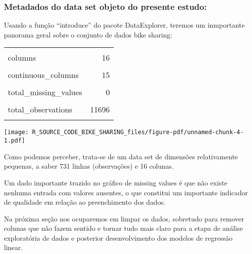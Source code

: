 \documentclass[
  letterpaper,
  DIV=11,
  numbers=noendperiod]{scrartcl}
\begin{document}
\subsubsection{Metadados do data set objeto do presente
estudo:}\label{metadados-do-data-set-objeto-do-presente-estudo}

Usando a função ``introduce'' do pacote DataExplorer, teremos um
inmportante panorama geral sobre o conjunto de dados bike sharing:

\begin{table}[!h]
\centering\begingroup\fontsize{8}{10}\selectfont

\begin{tabular}{lr}
\toprule
\cellcolor{gray!15}{rows} & \cellcolor{gray!15}{731}\\
columns & 16\\
\cellcolor{gray!15}{discrete\_columns} & \cellcolor{gray!15}{1}\\
continuous\_columns & 15\\
\cellcolor{gray!15}{all\_missing\_columns} & \cellcolor{gray!15}{0}\\
\addlinespace
total\_missing\_values & 0\\
\cellcolor{gray!15}{complete\_rows} & \cellcolor{gray!15}{731}\\
total\_observations & 11696\\
\cellcolor{gray!15}{memory\_usage} & \cellcolor{gray!15}{112208}\\
\bottomrule
\end{tabular}
\endgroup{}
\end{table}

\begin{center}
\texttt{[image: R\_SOURCE\_CODE\_BIKE\_SHARING\_files/figure-pdf/unnamed-chunk-4-1.pdf]}
\end{center}

Como podemos perceber, trata-se de um data set de dimensões
relativamente pequenas, a saber 731 linhas (observações) e 16 colunas.

Um dado importante trazido no gráfico de missing values é que não existe
nenhuma entrada com valores ausentes, o que constitui um importante
indicador de qualidade em relação ao preenchimento dos dados.

Na próxima seção nos ocuparemos em limpar os dados, sobretudo para
remover colunas que não fazem sentido e tornar tudo mais claro para a
etapa de análise exploratória de dados e posterior desenvolvimento dos
modelos de regressão linear.
\end{document}
